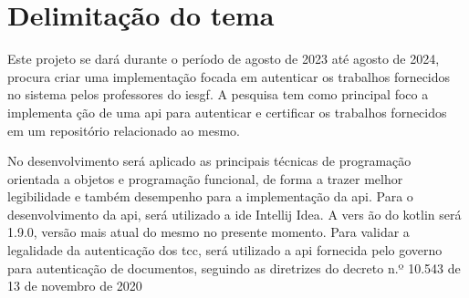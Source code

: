 \section{Delimitação do tema}

Este projeto se dará durante o período de
agosto de 2023 até agosto de 2024, procura
criar uma implementação focada em autenticar os
trabalhos fornecidos no sistema pelos
professores do \acrfull{iesgf}.
A pesquisa tem como principal foco a implementa
ção de uma \acrfull{api} para autenticar e
certificar os trabalhos fornecidos em um
repositório relacionado ao mesmo.

No desenvolvimento será aplicado as principais
técnicas de programação orientada a objetos e
programação funcional, de forma a trazer melhor
legibilidade e também desempenho para a
implementação da \acrshort{api}.
Para o desenvolvimento da \acrshort{api}, será
utilizado a \acrfull{ide} Intellij Idea. A vers
ão do \acrshort{kotlin} será 1.9.0, versão mais
atual do mesmo no presente momento.
Para validar a legalidade da autenticação dos \acrlong{tcc}, será
utilizado a \acrshort{api} fornecida pelo
governo para autenticação de documentos,
seguindo as diretrizes do decreto n.º 10.543 de
13 de novembro de 2020~\cite{decreto112020}

